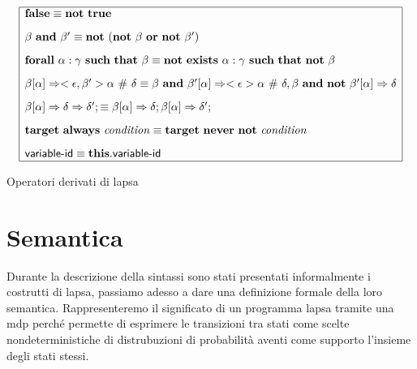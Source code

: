 \begin{table}[htbp!]
$$
\begin{array}{|l|}
	\hline
	\mathbf{false} \equiv \mathbf{not} \mbox{ } \mathbf{true}
	\\[.3cm]
	\beta \mbox{ } \mathbf{and} \mbox{ } \beta' \equiv \mathbf{not} \mbox{ } (\mathbf{not} \mbox{ } \beta \mbox{ } \mathbf{or} \mbox{ } \mathbf{not} \mbox{ } \beta')
	\\[.3cm]
	\mathbf{forall} \mbox{ } \alpha:\gamma \mbox{ } \mathbf{such} \mbox{ } \mathbf{that} \mbox{ } \beta \equiv \mathbf{not} \mbox{ } \mathbf{exists} \mbox{ } \alpha:\gamma \mbox{ } \mathbf{such} \mbox{ } \mathbf{that} \mbox{ } \mathbf{not} \mbox{ } \beta
	\\[.3cm]
	\beta [\alpha] \Rightarrow <\epsilon,\beta'> \alpha \mbox{ } \# \mbox{ } \delta
	\equiv
	\beta \mbox{ } \mathbf{and} \mbox{ } \beta' [\alpha]\Rightarrow <\epsilon> \alpha \mbox{ } \# \mbox{ } \delta,
	\beta \mbox{ } \mathbf{and} \mbox{ } \mathbf{not} \mbox{ } \beta' [\alpha]\Rightarrow \delta
	\\[.3cm]
	\beta [\alpha] \Rightarrow \delta \Rightarrow \delta';
	\equiv
	\beta [\alpha] \Rightarrow \delta; \beta [\alpha] \Rightarrow \delta';
	\\[.3cm]
	\mathbf{target}\ \mathbf{always}\ \mathit{condition} \equiv \mathbf{target}\ \mathbf{never}\ \mathbf{not}\ \mathit{condition}
	\\[.3cm]
	{\sf variable}\textrm{-}{\sf id} \equiv \mathbf{this}.{\sf variable}\textrm{-}{\sf id}
	\\
	\hline
\end{array}
$$
\caption{Operatori derivati di \acs{lapsa}}
\label{tab:ssugar}
\end{table}


\section{Semantica}
Durante la descrizione della sintassi sono stati presentati informalmente i costrutti di \ac{lapsa}, passiamo adesso a dare una definizione formale della loro semantica. Rappresenteremo il significato di un programma \ac{lapsa} tramite una \ac{mdp} perché permette di esprimere le transizioni tra stati come scelte nondeterministiche di distrubuzioni di probabilità aventi come supporto l'insieme degli stati stessi.

